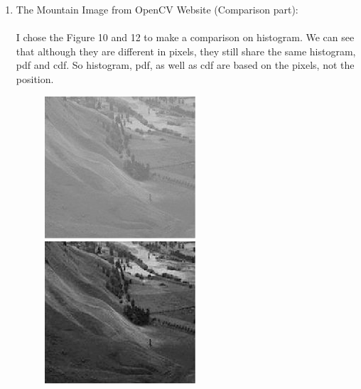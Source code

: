 \documentclass{article}
\begin{document}
\begin{enumerate}[label=B\arabic*)]
\begin{enumerate}[label=\arabic*)]
				\pagebreak
			\item The Mountain Image from OpenCV Website (Comparison part):
				\\
				\\
				I chose the Figure 10 and 12 to make a comparison on histogram. We can see that although they are different in pixels, they still share the same histogram, pdf and cdf. So histogram, pdf, as well as cdf are based on the pixels, not the position. 
				\begin{figure}[h!]
					\begin{minipage}{0.32\textwidth}
						\centering
						\includegraphics[width=0.9\linewidth]{Hist/Hist1.jpg}
					\end{minipage}
					\hfill
					\begin{minipage}{0.32\textwidth}
						\centering
						\includegraphics[width=0.9\linewidth]{Hist/Hist1_gray.png}

\end{minipage}
\end{figure}
\end{enumerate}
\end{enumerate}
\end{document}

